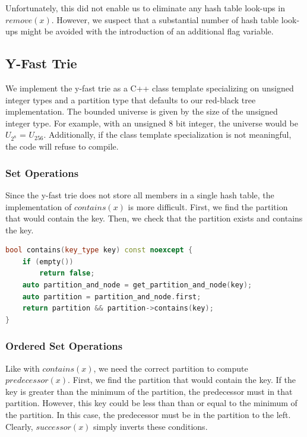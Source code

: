 \documentclass{article}
\begin{document}
\noindent
Unfortunately, this did not enable us to eliminate any hash table look-ups in $remove(x)$. However, we suspect that a substantial number of hash table look-ups might be avoided with the introduction of an additional flag variable.  

\subsection{Y-Fast Trie}
\noindent
We implement the y-fast trie as a C++ class template specializing on unsigned integer types and a partition type that defaults to our red-black tree implementation. The bounded universe is given by the size of the unsigned integer type. For example, with an unsigned 8 bit integer, the universe would be $U_{2^8}$ = $U_{256}$. Additionally, if the class template specialization is not meaningful, the code will refuse to compile.

\subsubsection{Set Operations} 

Since the y-fast trie does not store all members in a single hash table, the implementation of $contains(x)$ is more difficult. First, we find the partition that would contain the key. Then, we check that the partition exists and contains the key.

\begin{lstlisting}[language=C++,basicstyle=\small]
bool contains(key_type key) const noexcept {
	if (empty()) 
	    return false;
	auto partition_and_node = get_partition_and_node(key);
	auto partition = partition_and_node.first;
	return partition && partition->contains(key);
}
\end{lstlisting}

\subsubsection{Ordered Set Operations}

Like with $contains(x)$, we need the correct partition to compute $predecessor(x)$. First, we find the partition that would contain the key. If the key is greater than the minimum of the partition, the predecessor must in that partition. However, this key could be less than than or equal to the minimum of the partition. In this case, the predecessor must be in the partition to the left. Clearly, $successor(x)$ simply inverts these conditions. 
\end{document}
